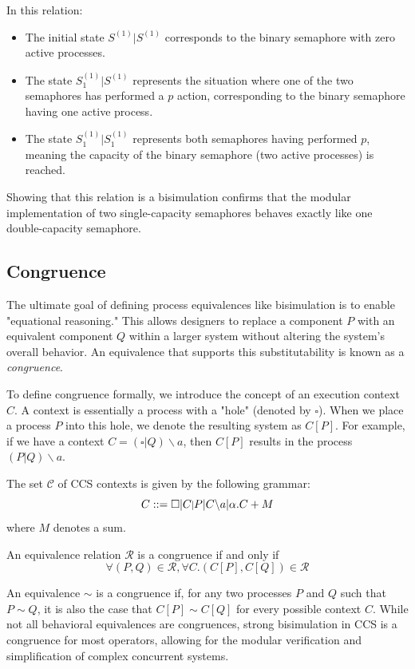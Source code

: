 In this relation:
\begin{itemize}
    \item The initial state $S^{(1)}|S^{(1)}$ corresponds to the binary semaphore with zero active processes.
    \item The state $S_1^{(1)}|S^{(1)}$ represents the situation where one of the two semaphores has performed a $p$ action, corresponding to the binary semaphore having one active process.
    \item The state $S_1^{(1)}|S_1^{(1)}$ represents both semaphores having performed $p$, meaning the capacity of the binary semaphore (two active processes) is reached.
\end{itemize}

Showing that this relation is a bisimulation confirms that the modular implementation of two single-capacity semaphores behaves exactly like one double-capacity semaphore.

\subsection{Congruence}
The ultimate goal of defining process equivalences like bisimulation is to enable "equational reasoning." This allows designers to replace a component $P$ with an equivalent component $Q$ within a larger system without altering the system's overall behavior. An equivalence that supports this substitutability is known as a \textit{congruence}.

To define congruence formally, we introduce the concept of an execution context $C$. A context is essentially a process with a "hole" (denoted by $\square$). When we place a process $P$ into this hole, we denote the resulting system as $C[P]$. For example, if we have a context $C=(\square|Q)\backslash a$, then $C[P]$ results in the process $(P|Q)\backslash a$.

The set $\mathcal{C}$ of CCS contexts is given by the following grammar:
\begin{equation*}
    C ::= \square|C \scalebox{0.8}{$|$} P | C\backslash a | \alpha.C+M
\end{equation*}
where $M$ denotes a sum.

An equivalence relation $\mathcal{R}$ is a congruence if and only if
\begin{equation*}
    \forall(P, Q)\in \mathcal{R}, \forall C.(C[P], C[Q])\in \mathcal{R}
\end{equation*}

An equivalence $\sim$ is a congruence if, for any two processes $P$ and $Q$ such that $P\sim Q$, it is also the case that $C[P]\sim C[Q]$ for every possible context $C$. While not all behavioral equivalences are congruences, strong bisimulation in CCS is a congruence for most operators, allowing for the modular verification and simplification of complex concurrent systems.

